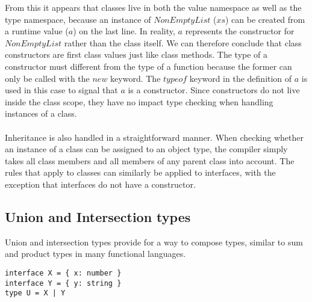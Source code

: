 From this it appears that classes live in both the value namespace as well as the type namespace,
because an instance of $NonEmptyList$ ($xs$) can be created from a runtime value ($a$) on the last line.
In reality, $a$ represents the constructor for $NonEmptyList$ rather than the class itself.
We can therefore conclude that class constructors are first class values just like class methods.
The type of a constructor must different from the type of a function because the former can only be called with the $new$ keyword.
The $typeof$ keyword in the definition of $a$ is used in this case to signal that $a$ is a constructor.
Since constructors do not live inside the class scope, they have no impact type checking when handling instances of a class.
\\
\\
Inheritance is also handled in a straightforward manner.
When checking whether an instance of a class can be assigned to an object type, the compiler
simply takes all class members and all members of any parent class into account.
The rules that apply to classes can similarly be applied to interfaces, with the exception that interfaces do not have a constructor.

\subsection{Union and Intersection types}
Union and intersection types provide for a way to compose types, similar to sum and product types in many functional languages.
\begin{lstlisting}
interface X = { x: number }
interface Y = { y: string }
type U = X | Y
\end{lstlisting}

